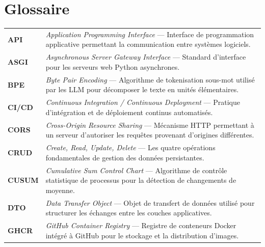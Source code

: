 
\chapter*{Glossaire}

\vspace{0.3cm}

\begin{longtable}{p{3.5cm} p{11cm}}

\textbf{API} & \textit{Application Programming Interface} --- Interface de programmation applicative permettant la communication entre systèmes logiciels. \\[6pt]

\textbf{ASGI} & \textit{Asynchronous Server Gateway Interface} --- Standard d'interface pour les serveurs web Python asynchrones. \\[6pt]

\textbf{BPE} & \textit{Byte Pair Encoding} --- Algorithme de tokenisation sous-mot utilisé par les LLM pour décomposer le texte en unités élémentaires. \\[6pt]

\textbf{CI/CD} & \textit{Continuous Integration / Continuous Deployment} --- Pratique d'intégration et de déploiement continus automatisés. \\[6pt]

\textbf{CORS} & \textit{Cross-Origin Resource Sharing} --- Mécanisme HTTP permettant à un serveur d'autoriser les requêtes provenant d'origines différentes. \\[6pt]

\textbf{CRUD} & \textit{Create, Read, Update, Delete} --- Les quatre opérations fondamentales de gestion des données persistantes. \\[6pt]

\textbf{CUSUM} & \textit{Cumulative Sum Control Chart} --- Algorithme de contrôle statistique de processus pour la détection de changements de moyenne. \\[6pt]

\textbf{DTO} & \textit{Data Transfer Object} --- Objet de transfert de données utilisé pour structurer les échanges entre les couches applicatives. \\[6pt]

\textbf{GHCR} & \textit{GitHub Container Registry} --- Registre de conteneurs Docker intégré à GitHub pour le stockage et la distribution d'images. \\[6pt]


\end{longtable}
